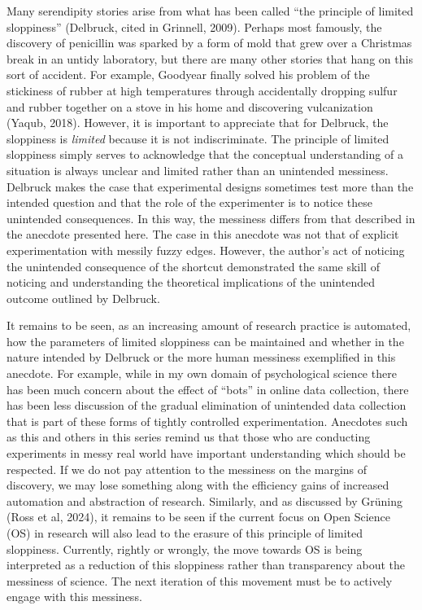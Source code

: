 \documentclass[authordate, commentary]{jote-new-article}
\begin{document}
	Many serendipity stories arise from what has been called “the principle of limited sloppiness” (Delbruck, cited in Grinnell, 2009). Perhaps most famously, the discovery of penicillin was sparked by a form of mold that grew over a Christmas break in an untidy laboratory, but there are many other stories that hang on this sort of accident. For example, Goodyear finally solved his problem of the stickiness of rubber at high temperatures through accidentally dropping sulfur and rubber together on a stove in his home and discovering vulcanization (Yaqub, 2018). However, it is important to appreciate that for Delbruck, the sloppiness is \emph{limited} because it is not indiscriminate. The principle of limited sloppiness simply serves to acknowledge that the conceptual understanding of a situation is always unclear and limited rather than an unintended messiness. Delbruck makes the case that experimental designs sometimes test more than the intended question and that the role of the experimenter is to notice these unintended consequences. In this way, the messiness differs from that described in the anecdote presented here. The case in this anecdote was not that of explicit experimentation with messily fuzzy edges. However, the author's act of noticing the unintended consequence of the shortcut demonstrated the same skill of noticing and understanding the theoretical implications of the unintended outcome outlined by Delbruck.



	It remains to be seen, as an increasing amount of research practice is automated, how the parameters of limited sloppiness can be maintained and whether in the nature intended by Delbruck or the more human messiness exemplified in this anecdote. For example, while in my own domain of psychological science there has been much concern about the effect of “bots” in online data collection, there has been less discussion of the gradual elimination of unintended data collection that is part of these forms of tightly controlled experimentation. Anecdotes such as this and others in this series remind us that those who are conducting experiments in messy real world have important understanding which should be respected. If we do not pay attention to the messiness on the margins of discovery, we may lose something along with the efficiency gains of increased automation and abstraction of research. Similarly, and as discussed by Grüning (Ross et al, 2024), it remains to be seen if the current focus on Open Science (OS) in research will also lead to the erasure of this principle of limited sloppiness. Currently, rightly or wrongly, the move towards OS is being interpreted as a reduction of this sloppiness rather than transparency about the messiness of science. The next iteration of this movement must be to actively engage with this messiness.
\end{document}
